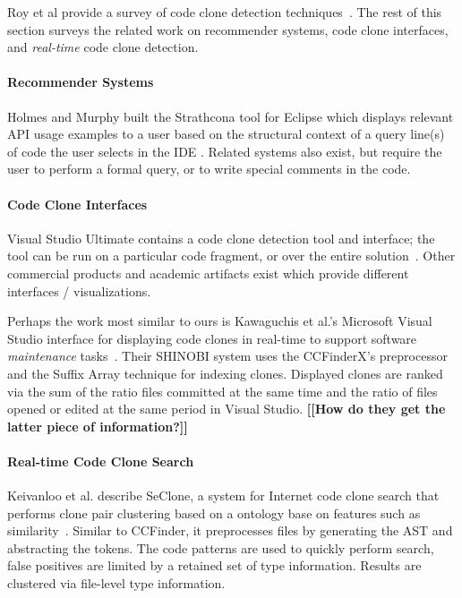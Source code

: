 \documentclass[preprint,10pt]{sigplanconf}
\newcommand{\todo}[1]{{\bfseries [[#1]]}}
\begin{document}
Roy et al provide a survey of code clone detection
techniques~\cite{Roy2009}. The rest of this section surveys the
related work on recommender systems, code clone interfaces, and
\emph{real-time} code clone detection.

\paragraph{Recommender Systems}

Holmes and Murphy built the Strathcona tool for Eclipse which displays
relevant API usage examples to a user based on the structural context
of a query line(s) of code the user selects in the IDE
\cite{Holmes2005}. Related systems also exist, but require the user to
perform a formal query, or to write special comments in the code.

\paragraph{Code Clone Interfaces}

Visual Studio Ultimate contains a code clone detection tool and
interface; the tool can be run on a particular code fragment, or over
the entire solution~\cite{VSClones}. Other commercial products and
academic artifacts exist which provide different interfaces /
visualizations.

Perhaps the work most similar to ours is Kawaguchis et al.'s 
Microsoft Visual Studio interface for
displaying code clones in real-time to support software
\emph{maintenance} tasks~\cite{Kawaguchi2009,Yamashina2008}. Their
SHINOBI system uses the CCFinderX's preprocessor and the Suffix Array
technique for indexing clones. Displayed clones are ranked via the sum
of the ratio files committed at the same time and the ratio of files
opened or edited at the same period in Visual Studio. \todo{How do
  they get the latter piece of information?}

\paragraph{Real-time Code Clone Search}

Keivanloo et al. describe SeClone, a system for Internet code clone
search that performs clone pair clustering based on a ontology base on
features such as similarity~\cite{Keivanloo2011}. Similar to CCFinder,
it preprocesses files by generating the AST and abstracting the
tokens. The code patterns are used to quickly perform search, false
positives are limited by a retained set of type information. Results
are clustered via file-level type information.
\end{document}

